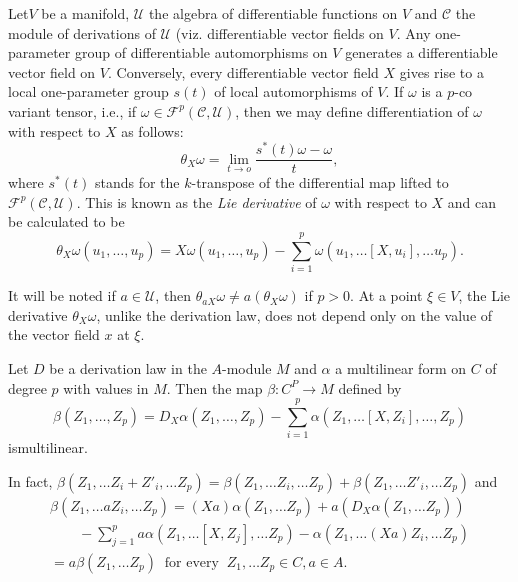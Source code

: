 Let\pageoriginale $V$ be a manifold, $\mathscr{U}$ the algebra of differentiable
functions on $V$ and $\mathscr{C}$ the module of derivations of
$\mathscr{U}$ (viz. differentiable vector fields on $V$. Any
one-parameter group of differentiable automorphisms on $V$ generates a
differentiable vector field on $V$. Conversely,
every differentiable vector field $X$ gives rise to a local
one-parameter group $s(t)$ of local automorphisms of $V$. If $\omega$
is a  $p$-co variant tensor, i.e., if $\omega \in
\mathscr{F}^p(\mathscr{C}, \mathscr{U})$, then we may define
differentiation of $\omega$ with respect to $X$ as follows: 
$$
\theta_X \omega = \lim_{t \to o} \frac{s^*(t) \omega - \omega}{t},
$$
where $s^*(t)$ stands for the $k$-transpose of the differential  map
lifted to $\mathscr{F}^p (\mathscr{C}, \mathscr{U})$. This is known as
the \textit{Lie derivative} of $\omega$ with respect to $X$ and can be
calculated to be  
$$
\theta_X \omega(u_1, \ldots , u_p) = X \omega (u_1 , \ldots  ,u_p) -
\sum_{i=1}^p \omega (u_1, \ldots [X, u_i], \ldots u_p).  
$$

It will be noted if $a \in \mathscr{U}$, then $\theta_{a X} \omega
\neq a (\theta_X \omega)$ if $p > 0$. At a point $\xi \in V$, the Lie
derivative $\theta_X \omega$, unlike the derivation  law, does not
depend only on the value of the vector field $x$ at $\xi$. 

\begin{lem}\label{chap1:sec4:lem1}%
  Let $D$ be a derivation  law in the $A$-module $M$ and $\alpha$ a
  multilinear form on $C$ of degree $p$ with values in $M$. Then the
  map $\beta: C^P \to M$ defined by  
  $$
  \beta(Z_1, \ldots , Z_p)= D_X \alpha(Z_1, \ldots , Z_p) -
  \sum_{i=1}^p \alpha (Z_1, \ldots [X, Z_i],  \ldots , Z_p) 
  $$
  is\pageoriginale multilinear.
\end{lem}

\noindent In fact,  $\beta (Z_1, \ldots  Z_i + Z'_i , \dots Z_p) = \beta(Z_1,
\ldots Z_i, \ldots Z_p) + \beta(Z_1, \ldots Z'_i , \ldots Z_p)$ 
and 
\begin{multline*}
  \beta(Z_1, \ldots a Z_i ,\ldots Z_p) = (Xa) \alpha (Z_1, \ldots
  Z_p) +a (D_X \alpha (Z_1, \ldots Z_p)) \\ 
  \qquad - \sum_{j=1}^p a \alpha(Z_1 , \ldots [X,Z_j], \ldots Z_p)-
  \alpha(Z_1,  \ldots (Xa) Z_i , \ldots Z_p) \\ 
  = a \beta (Z_1,\ldots Z_p) ~ \text{ for every } ~ Z_1, \ldots Z_p
  \in C, a \in A.  
\end{multline*}

